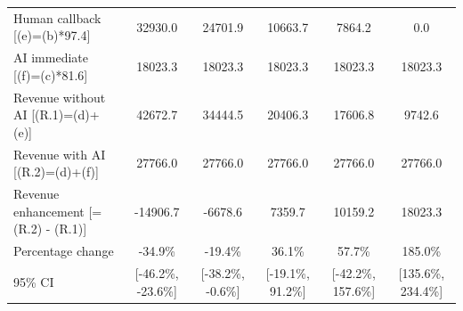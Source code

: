 \begin{tabular}{lccccc}
\hspace{1em} Human callback [(e)=(b)*97.4] & 32930.0 & 24701.9 & 10663.7 & 7864.2 & 0.0 \\
\hspace{1em} AI immediate [(f)=(c)*81.6] & 18023.3 & 18023.3 & 18023.3 & 18023.3 & 18023.3 \\
\hspace{1em} Revenue without AI [(R.1)=(d)+(e)] & 42672.7 & 34444.5 & 20406.3 & 17606.8 & 9742.6 \\
\hspace{1em} Revenue with AI [(R.2)=(d)+(f)] & 27766.0 & 27766.0 & 27766.0 & 27766.0 & 27766.0 \\
\hspace{1em} Revenue enhancement [= (R.2) - (R.1)] & -14906.7 & -6678.6 & 7359.7 & 10159.2 & 18023.3 \\
\hspace{2em} Percentage change & -34.9\% & -19.4\% & 36.1\% & 57.7\% & 185.0\% \\
\hspace{2em} 95\% CI & [-46.2\%, -23.6\%] & [-38.2\%, -0.6\%] & [-19.1\%, 91.2\%] & [-42.2\%, 157.6\%] & [135.6\%, 234.4\%] \\
\bottomrule
\end{tabular}